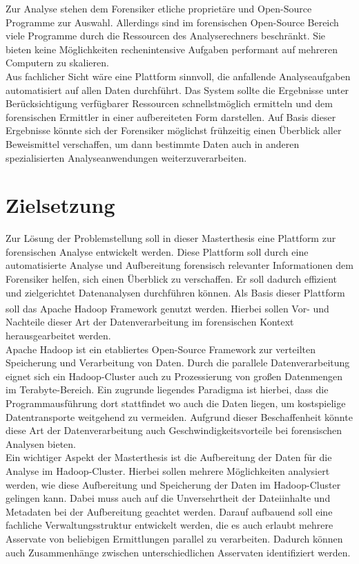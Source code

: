\noindent
Zur Analyse stehen dem Forensiker etliche proprietäre und Open-Source Programme zur Auswahl. Allerdings sind im forensischen Open-Source Bereich viele Programme durch die Ressourcen des Analyserechners beschränkt. Sie bieten keine Möglichkeiten rechenintensive Aufgaben performant auf mehreren Computern zu skalieren.\\

\noindent
Aus fachlicher Sicht wäre eine Plattform sinnvoll, die anfallende Analyseaufgaben automatisiert auf allen Daten durchführt. Das System sollte die Ergebnisse unter Berücksichtigung verfügbarer Ressourcen schnellstmöglich ermitteln und dem forensischen Ermittler in einer aufbereiteten Form darstellen. Auf Basis dieser Ergebnisse könnte sich der Forensiker möglichst frühzeitig einen Überblick aller Beweismittel verschaffen, um dann bestimmte Daten auch in anderen spezialisierten Analyseanwendungen weiterzuverarbeiten. 

\section{Zielsetzung}
Zur Lösung der Problemstellung soll in dieser Masterthesis eine Plattform zur forensischen Analyse entwickelt werden. Diese Plattform soll durch eine automatisierte Analyse und Aufbereitung forensisch relevanter Informationen dem Forensiker helfen, sich einen Überblick zu verschaffen. Er soll dadurch effizient und zielgerichtet Datenanalysen durchführen können. Als Basis dieser Plattform soll das Apache Hadoop\textsuperscript{\textregistered} Framework genutzt werden. Hierbei sollen Vor- und Nachteile dieser Art der Datenverarbeitung im forensischen Kontext herausgearbeitet werden.\\ 

\noindent
Apache Hadoop ist ein etabliertes Open-Source Framework zur verteilten Speicherung und Verarbeitung von Daten. Durch die parallele Datenverarbeitung eignet sich ein Hadoop-Cluster auch zu Prozessierung von großen Datenmengen im Terabyte-Bereich. Ein zugrunde liegendes Paradigma ist hierbei, dass die Programmausführung dort stattfindet wo auch die Daten liegen, um kostspielige Datentransporte weitgehend zu vermeiden. Aufgrund dieser Beschaffenheit könnte diese Art der Datenverarbeitung auch Geschwindigkeitsvorteile bei forensischen Analysen bieten. \\

\noindent
Ein wichtiger Aspekt der Masterthesis ist die Aufbereitung der Daten für die Analyse im Hadoop-Cluster. Hierbei sollen mehrere Möglichkeiten analysiert werden, wie diese Aufbereitung und Speicherung der Daten im Hadoop-Cluster gelingen kann. Dabei muss auch auf die Unversehrtheit der Dateiinhalte und Metadaten bei der Aufbereitung geachtet werden. Darauf aufbauend soll eine fachliche Verwaltungsstruktur entwickelt werden, die es auch erlaubt mehrere Asservate von beliebigen Ermittlungen parallel zu verarbeiten. Dadurch können auch Zusammenhänge zwischen unterschiedlichen Asservaten identifiziert werden.\\

